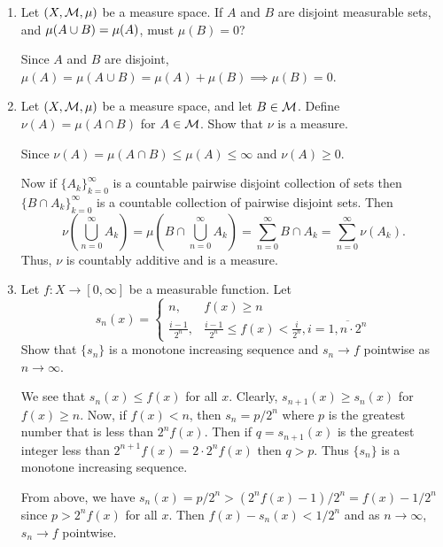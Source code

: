 \documentclass[12pt]{article}
\begin{document}
\begin{enumerate}
\item Let $(X, \mathcal{M}, \mu)$ be a measure space. If $A$ and $B$ are disjoint measurable sets, and $\displaystyle \mu(A \cup B) = \mu(A)$, must $\mu(B) = 0$?

\begin{mybox}
  Since $A$ and $B$ are disjoint,
  $\mu(A)=\mu(A\cup B)=\mu(A)+\mu(B)\implies \mu(B)=0$.
\end{mybox}

\item Let $(X, \mathcal{M}, \mu)$ be a measure space, and let $B \in \mathcal{M}$. Define $\nu(A) = \mu(A \cap B)$ for $A \in \mathcal{M}$. Show that $\nu$ is a measure.

\begin{mybox}
  Since $\nu(A)=\mu(A\cap B)\leq \mu(A)\leq\infty$ and
  $\nu(A)\geq 0$.

  \vspace*{2mm}
  Now if $\{A_k\}_{k=0}^\infty$ is a countable pairwise
  disjoint collection of sets then $\{B\cap A_k\}_{k=0}
  ^\infty$ is a countable collection of pairwise disjoint
  sets. Then
  $$\nu\left(\bigcup_{n=0}^\infty{A_k}\right)
  =\mu\left(B\cap\bigcup_{n=0}^\infty{A_k}\right)
  =\sum_{n=0}^{\infty}{B\cap A_k}=\sum_{n=0}^{\infty}
  {\nu(A_k)}.$$
  Thus, $\nu$ is countably additive and is a measure.
\end{mybox}

\item Let $f: X \to [0, \infty]$ be a measurable function. Let
  $$s_n(x) =
  \begin{cases}
			n, & f(x) \geq n\\
			\frac{i-1}{2^n}, & \frac{i-1}{2^n} \leq f(x) < \frac{i}{2^n}, i = \overline{1, n\cdot 2^n}
	\end{cases}$$
Show that $\{s_n\}$ is a monotone increasing sequence and $s_n \to f$ pointwise as $n \to \infty$. 

\begin{mybox}
  We see that $s_n(x)\leq f(x)$ for all $x$. Clearly,
  $s_{n+1}(x)\geq s_n(x)$ for $f(x)\geq n$. Now, if
  $f(x)<n$, then $s_n=p/2^n$ where $p$ is the greatest
  number that is less than $2^nf(x)$. Then if $q=s_{n+1}(x)$
  is the greatest integer less than $2^{n+1}f(x)=2\cdot
  2^nf(x)$ then $q>p$. Thus $\{s_n\}$ is a monotone
  increasing sequence.

  \vspace*{2mm}
  From above, we have $s_n(x)=p/2^n> (2^nf(x)-1)/2^n
  =f(x)-1/2^n$
  since $p>2^nf(x)$ for all $x$. Then $f(x)-s_n(x)<1/2^n$
  and as $n\to \infty$, $s_n\to f$ pointwise.
\end{mybox}


\end{enumerate}
\end{document}
